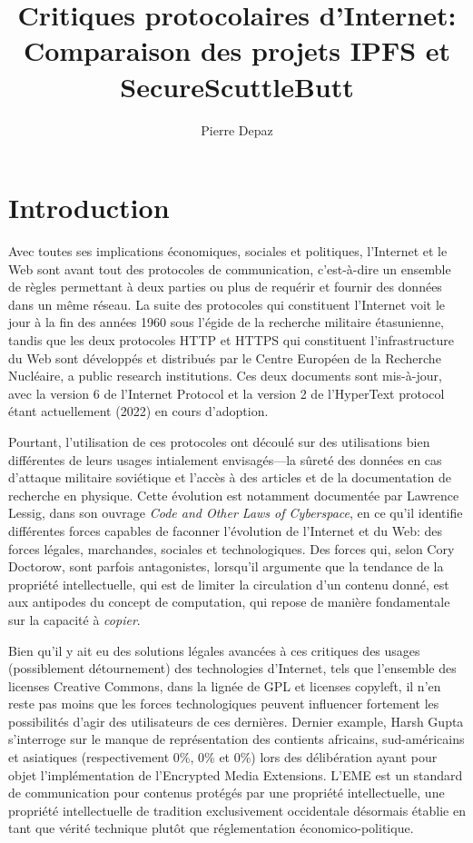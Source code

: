 \documentclass{article}
\begin{document}
\title{Critiques protocolaires d'Internet: Comparaison des projets IPFS et SecureScuttleButt}
\author{Pierre Depaz}
\maketitle

\section{Introduction}

Avec toutes ses implications économiques, sociales et politiques, l'Internet et le Web\cite{fielding_hypertext_2014} sont avant tout des protocoles de communication, c'est-à-dire un ensemble de règles permettant à deux parties ou plus de requérir et fournir des données dans un même réseau. La suite des protocoles qui constituent l'Internet voit le jour à la fin des années 1960 sous l'égide de la recherche militaire étasunienne, tandis que les deux protocoles HTTP et HTTPS qui constituent l'infrastructure du Web sont développés et distribués par le Centre Européen de la Recherche Nucléaire, a public research institutions. Ces deux documents sont mis-à-jour, avec la version 6 de l'Internet Protocol et la version 2 de l'HyperText protocol étant actuellement (2022) en cours d'adoption.

Pourtant, l'utilisation de ces protocoles ont découlé sur des utilisations bien différentes de leurs usages intialement envisagés—la sûreté des données en cas d'attaque militaire soviétique et l'accès à des articles et de la documentation de recherche en physique. Cette évolution est notamment documentée par Lawrence Lessig, dans son ouvrage \emph{Code and Other Laws of Cyberspace}\cite{lessig_code_1999}, en ce qu'il identifie différentes forces capables de faconner l'évolution de l'Internet et du Web: des forces légales, marchandes, sociales et technologiques. Des forces qui, selon Cory Doctorow, sont parfois antagonistes, lorsqu'il argumente que la tendance de la propriété intellectuelle, qui est de limiter la circulation d'un contenu donné, est aux antipodes du concept de computation, qui repose de manière fondamentale sur la capacité à \emph{copier}.

Bien qu'il y ait eu des solutions légales avancées à ces critiques des usages (possiblement détournement) des technologies d'Internet, tels que l'ensemble des licenses Creative Commons, dans la lignée de GPL et licenses copyleft, il n'en reste pas moins que les forces technologiques peuvent influencer fortement les possibilités d'agir des utilisateurs de ces dernières. Dernier example, Harsh Gupta s'interroge sur le manque de représentation des contients africains, sud-américains et asiatiques (respectivement 0\%, 0\% et 0\%) lors des délibération ayant pour objet l'implémentation de l'Encrypted Media Extensions. L'EME est un standard de communication pour contenus protégés par une propriété intellectuelle, une propriété intellectuelle de tradition exclusivement occidentale désormais établie en tant que vérité technique plutôt que réglementation économico-politique.
\end{document}
